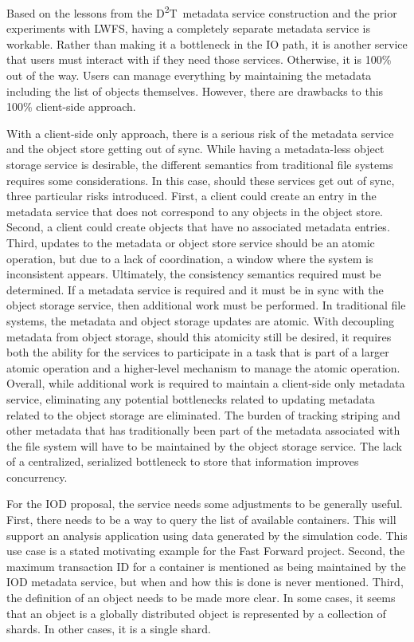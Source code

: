 \documentclass[conference]{sig-alt-gov2}
\newcommand{\DDT}{D\textsuperscript{2}T~}
\begin{document}
Based on the lessons from the \DDT metadata service construction and the prior
experiments with LWFS, having a completely separate metadata service is
workable. Rather than making it a bottleneck in the IO path, it is another
service that users must interact with if they need those services. Otherwise,
it is 100\% out of the way. Users can manage everything by maintaining the
metadata including the list of objects themselves. However, there are drawbacks
to this 100\% client-side approach.

With a client-side only approach, there is a serious risk of the metadata
service and the object store getting out of sync.  While having a metadata-less
object storage service is desirable, the different semantics from traditional
file systems requires some considerations. In this case, should these services
get out of sync, three particular risks introduced.  First, a client could
create an entry in the metadata service that does not correspond to any objects
in the object store. Second, a client could create objects that have no
associated metadata entries. Third, updates to the metadata or object store
service should be an atomic operation, but due to a lack of coordination, a
window where the system is inconsistent appears.  Ultimately, the consistency
semantics required must be determined. If a metadata service is required and it
must be in sync with the object storage service, then additional work must be
performed. In traditional file systems, the metadata and object storage updates
are atomic. With decoupling metadata from object storage, should this atomicity
still be desired, it requires both the ability for the services to participate
in a task that is part of a larger atomic operation and a higher-level
mechanism to manage the atomic operation. Overall, while additional work is
required to maintain a client-side only metadata service, eliminating any
potential bottlenecks related to updating metadata related to the object
storage are eliminated. The burden of tracking striping and other metadata that
has traditionally been part of the metadata associated with the file system
will have to be maintained by the object storage service. The lack of a
centralized, serialized bottleneck to store that information improves
concurrency.

For the IOD proposal, the service needs some adjustments to be generally
useful.  First, there needs to be a way to query the list of available
containers. This will support an analysis application using data generated by
the simulation code. This use case is a stated motivating example for the Fast
Forward project. Second, the maximum transaction ID for a container is
mentioned as being maintained by the IOD metadata service, but when and how
this is done is never mentioned.  Third, the definition of an object needs to
be made more clear. In some cases, it seems that an object is a globally
distributed object is represented by a collection of shards. In other cases, it
is a single shard.
\end{document}
